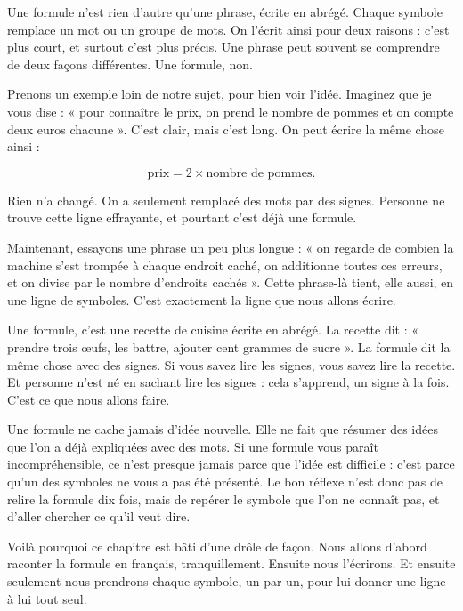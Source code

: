 \begin{enclair}
Une formule n'est rien d'autre qu'une phrase, écrite en abrégé. Chaque
symbole remplace un mot ou un groupe de mots. On l'écrit ainsi pour deux
raisons : c'est plus court, et surtout c'est plus précis. Une phrase peut
souvent se comprendre de deux façons différentes. Une formule, non.
\end{enclair}

Prenons un exemple loin de notre sujet, pour bien voir l'idée. Imaginez que
je vous dise : « pour connaître le prix, on prend le nombre de pommes et on
compte deux euros chacune ». C'est clair, mais c'est long. On peut écrire la
même chose ainsi :

\[
  \text{prix} = 2 \times \text{nombre de pommes} .
\]

Rien n'a changé. On a seulement remplacé des mots par des signes. Personne
ne trouve cette ligne effrayante, et pourtant c'est déjà une formule.

Maintenant, essayons une phrase un peu plus longue : « on regarde de combien
la machine s'est trompée à chaque endroit caché, on additionne toutes ces
erreurs, et on divise par le nombre d'endroits cachés ». Cette phrase-là
tient, elle aussi, en une ligne de symboles. C'est exactement la ligne que
nous allons écrire.

\begin{intuition}
Une formule, c'est une recette de cuisine écrite en abrégé. La recette
dit : « prendre trois œufs, les battre, ajouter cent grammes de sucre ». La
formule dit la même chose avec des signes. Si vous savez lire les signes,
vous savez lire la recette. Et personne n'est né en sachant lire les signes :
cela s'apprend, un signe à la fois. C'est ce que nous allons faire.
\end{intuition}

\begin{piege}
Une formule ne cache jamais d'idée nouvelle. Elle ne fait que résumer des
idées que l'on a déjà expliquées avec des mots. Si une formule vous
paraît incompréhensible, ce n'est presque jamais parce que l'idée est
difficile : c'est parce qu'un des symboles ne vous a pas été présenté. Le
bon réflexe n'est donc pas de relire la formule dix fois, mais de repérer le
symbole que l'on ne connaît pas, et d'aller chercher ce qu'il veut dire.
\end{piege}

Voilà pourquoi ce chapitre est bâti d'une drôle de façon. Nous allons
d'abord raconter la formule en français, tranquillement. Ensuite nous
l'écrirons. Et ensuite seulement nous prendrons chaque symbole, un par un,
pour lui donner une ligne à lui tout seul.

